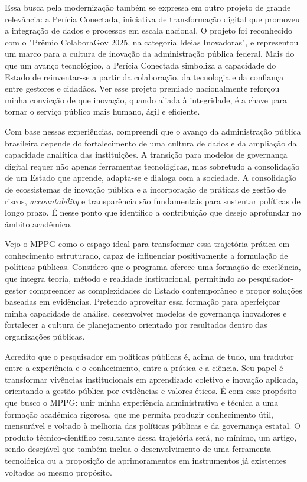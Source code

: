 \documentclass[12pt]{article}
\begin{document}
Essa busca pela modernização também se expressa em outro projeto de grande relevância: a Perícia Conectada, iniciativa de transformação digital que promoveu a integração de dados e processos em escala nacional. O projeto foi reconhecido com o "Prêmio ColaboraGov 2025, na categoria Ideias Inovadoras", e representou um marco para a cultura de inovação da administração pública federal. Mais do que um avanço tecnológico, a Perícia Conectada simboliza a capacidade do Estado de reinventar-se a partir da colaboração, da tecnologia e da confiança entre gestores e cidadãos. Ver esse projeto premiado nacionalmente reforçou minha convicção de que inovação, quando aliada à integridade, é a chave para tornar o serviço público mais humano, ágil e eficiente.

Com base nessas experiências, compreendi que o avanço da administração pública brasileira depende do fortalecimento de uma cultura de dados e da ampliação da capacidade analítica das instituições. A transição para modelos de governança digital requer não apenas ferramentas tecnológicas, mas sobretudo a consolidação de um Estado que aprende, adapta-se e dialoga com a sociedade. A consolidação de ecossistemas de inovação pública e a incorporação de práticas de gestão de riscos, \emph{accountability} e transparência são fundamentais para sustentar políticas de longo prazo. É nesse ponto que identifico a contribuição que desejo aprofundar no âmbito acadêmico.

Vejo o MPPG como o espaço ideal para transformar essa trajetória prática em conhecimento estruturado, capaz de influenciar positivamente a formulação de políticas públicas. Considero que o programa oferece uma formação de excelência, que integra teoria, método e realidade institucional, permitindo ao pesquisador-gestor compreender as complexidades do Estado contemporâneo e propor soluções baseadas em evidências. Pretendo aproveitar essa formação para aperfeiçoar minha capacidade de análise, desenvolver modelos de governança inovadores e fortalecer a cultura de planejamento orientado por resultados dentro das organizações públicas.

Acredito que o pesquisador em políticas públicas é, acima de tudo, um tradutor entre a experiência e o conhecimento, entre a prática e a ciência. Seu papel é transformar vivências institucionais em aprendizado coletivo e inovação aplicada, orientando a gestão pública por evidências e valores éticos. É com esse propósito que busco o MPPG: unir minha experiência administrativa e técnica a uma formação acadêmica rigorosa, que me permita produzir conhecimento útil, mensurável e voltado à melhoria das políticas públicas e da governança estatal. O produto técnico-científico resultante dessa trajetória será, no mínimo, um artigo, sendo desejável que também inclua o desenvolvimento de uma ferramenta tecnológica ou a proposição de aprimoramentos em instrumentos já existentes voltados ao mesmo propósito.
\end{document}
